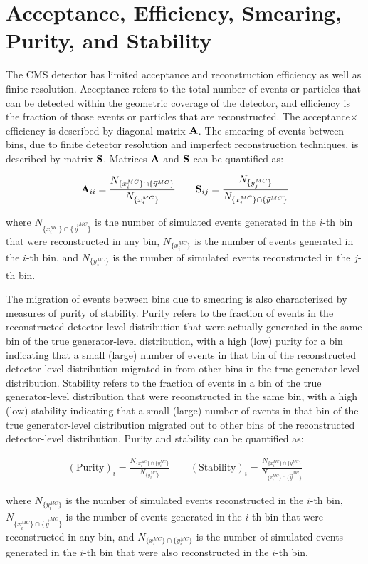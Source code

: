 \section{Acceptance, Efficiency, Smearing, Purity, and Stability}
The CMS detector has limited acceptance and reconstruction efficiency as well as finite resolution.
Acceptance refers to the total number of events or particles that can be detected within the geometric coverage of the detector, and efficiency is the fraction of those events or particles that are reconstructed.
The acceptance$\times$efficiency is described by diagonal matrix $\mathbf{A}$. 
The smearing of events between bins, due to finite detector resolution and imperfect reconstruction techniques, is described by matrix $\mathbf{S}$.
Matrices $\mathbf{A}$ and $\mathbf{S}$ can be quantified as:
\begin{linenomath*}
\begin{align}
\mathbf{A}_{ii} = \frac{N_{ \{ x_i^{MC} \} \cap \{ \vec{y}^{MC} \}}}{N_{ \{ x_i^{MC} \} }} \quad \quad
\mathbf{S}_{ij} = \frac{N_{ \{ y_j^{MC} \} }}{N_{ \{ x_i^{MC} \} \cap \{ \vec{y}^{MC} \}}}
\end{align}
\end{linenomath*}
where $N_{ \{ x_i^{MC} \} \cap \{ \vec{y}^{MC} \}}$ is the number of simulated events generated in the $i$-th bin that were reconstructed in any bin, $N_{ \{ x_i^{MC} \} }$ is the number of events generated in the $i$-th bin, and $N_{ \{ y_j^{MC} \} }$ is the number of simulated events reconstructed in the $j$-th bin.

The migration of events between bins due to smearing is also characterized by measures of purity of stability.
Purity refers to the fraction of events in the reconstructed detector-level distribution that were actually generated in the same bin of the true generator-level distribution, with a high (low) purity for a bin indicating that a small (large) number of events in that bin of the reconstructed detector-level distribution migrated in from other bins in the true generator-level distribution.
Stability refers to the fraction of events in a bin of the true generator-level distribution that were reconstructed in the same bin, with a high (low) stability indicating that a small (large) number of events in that bin of the true generator-level distribution migrated out to other bins of the reconstructed detector-level distribution.
Purity and stability can be quantified as:
\begin{linenomath*}
\begin{align}
(\text{Purity})_i = \frac{N_{ \{ x_i^{MC} \} \cap \{ y_i^{MC} \} }}{N_{ \{ y_i^{MC} \} }} \quad \quad
(\text{Stability})_i = \frac{N_{ \{ x_i^{MC} \} \cap \{ y_i^{MC} \} }}{N_{ \{ x_i^{MC} \} \cap \{ \vec{y}^{MC} \}}}
\end{align}
\end{linenomath*}
where $N_{ \{ y_i^{MC} \} }$ is the number of simulated events reconstructed in the $i$-th bin, $N_{ \{ x_i^{MC} \} \cap \{ \vec{y}^{MC} \}}$ is the number of events generated in the $i$-th bin that were reconstructed in any bin, and $N_{ \{ x_i^{MC} \} \cap \{ y_i^{MC} \} }$ is the number of simulated events generated in the $i$-th bin that were also reconstructed in the $i$-th bin.

